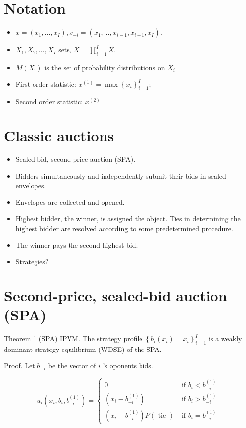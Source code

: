 \documentclass[10pt]{article}
\begin{document}
\section*{Notation}
\begin{itemize}
  \item $x=\left(x_{1}, \ldots, x_{I}\right), x_{-i}=\left(x_{1}, \ldots, x_{i-1}, x_{i+1}, x_{I}\right)$.
  \item $X_{1}, X_{2}, \ldots, X_{I}$ sets, $X=\prod_{i=1}^{I} X$.
  \item $M\left(X_{i}\right)$ is the set of probability distributions on $X_{i}$.
  \item First order statistic: $x^{(1)}=\max \left\{x_{i}\right\}_{i=1}^{I}$;
  \item Second order statistic: $x^{(2)}$
\end{itemize}

\section*{Classic auctions}
\begin{itemize}
  \item Sealed-bid, second-price auction (SPA).
  \item Bidders simultaneously and independently submit their bids in sealed envelopes.
  \item Envelopes are collected and opened.
  \item Highest bidder, the winner, is assigned the object. Ties in determining the highest bidder are resolved according to some predetermined procedure.
  \item The winner pays the second-highest bid.
  \item Strategies?
\end{itemize}

\section*{Second-price, sealed-bid auction (SPA)}
Theorem 1 (SPA) IPVM. The strategy profile $\left\{b_{i}\left(x_{i}\right)=x_{i}\right\}_{i=1}^{I}$ is a weakly dominant-strategy equilibrium (WDSE) of the SPA.

Proof. Let $b_{-i}$ be the vector of $i$ 's oponents bids.

$$
u_{i}\left(x_{i}, b_{i}, b_{-i}^{(1)}\right)= \begin{cases}0 & \text { if } b_{i}<b_{-i}^{(1)} \\ \left(x_{i}-b_{-i}^{(1)}\right) & \text { if } b_{i}>b_{-i}^{(1)} \\ \left(x_{i}-b_{-i}^{(1)}\right) P(\text { tie }) & \text { if } b_{i}=b_{-i}^{(1)}\end{cases}
$$
\end{document}
